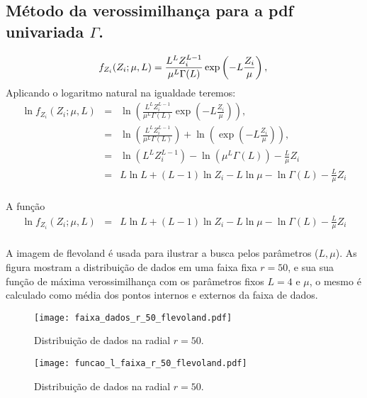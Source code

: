 \subsection{Método da verossimilhança para a pdf univariada $\Gamma$.}
\begin{equation}\label{cap_acf_23}
	f_{Z_{i}}(Z_{i};\mu,L)=\frac{L^{L}Z_{i}^{L-1}}{\mu^{L}\Gamma(L)} \exp\left(-L\frac{Z_{i}}{\mu}\right), \\
\end{equation}
Aplicando o logaritmo natural na igualdade teremos:
\begin{equation}\label{cap_acf_23}
\begin{array}{ccc}
	\ln f_{Z_{i}}(Z_{i};\mu,L)&=&\ln \left(\frac{L^{L}Z_{i}^{L-1}}{\mu^{L}\Gamma(L)} \exp\left(-L\frac{Z_{i}}{\mu}\right)\right), \\
	                                         &=&\ln \left(\frac{L^{L}Z_{i}^{L-1}}{\mu^{L}\Gamma(L)}\right) + \ln\left(\exp\left(-L\frac{Z_{i}}{\mu}\right)\right), \\
	                                         &=&\ln \left(L^{L}Z_{i}^{L-1} \right)-\ln\left(\mu^{L}\Gamma(L)\right) -\frac{L}{\mu} Z_i\\
	                                         &=&L\ln L +(L - 1) \ln Z_{i}-L \ln \mu-\ln \Gamma(L) -\frac{L}{\mu} Z_i\\
\end{array}
\end{equation}


A função 
\begin{equation}\label{func_log_univ_gaussiana}
\begin{array}{ccc}
	\ln f_{Z_{i}}(Z_{i};\mu,L)&=& L\ln L +(L - 1) \ln Z_{i}-L \ln \mu-\ln \Gamma(L) -\frac{L}{\mu} Z_i\\
\end{array}
\end{equation}

A imagem de flevoland é usada para ilustrar a busca pelos parâmetros ($L, \mu$). As figura mostram a distribuição de dados em uma faixa fixa $r=50$, e sua sua função de máxima verossimilhança com os parâmetros fixos $L=4$ e $\mu$, o mesmo é calculado como média dos pontos internos e externos da faixa de dados. 

\begin{figure}[hbt]
  \texttt{[image: faixa\_dados\_r\_50\_flevoland.pdf]}
  	\caption{Distribuição de dados na radial $r=50$.}\label{cap_acf_fig04}
\endminipage\hfill
{}
  \texttt{[image: funcao\_l\_faixa\_r\_50\_flevoland.pdf]}
		\caption{Distribuição de dados na radial $r=50$.}\label{cap_acf_fig05}
\endminipage\hfill
\end{figure}

